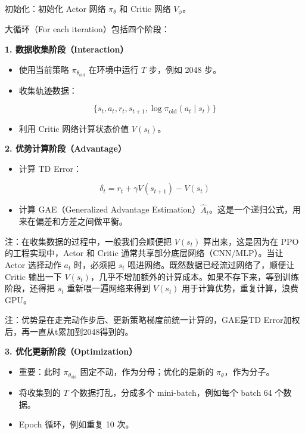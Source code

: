 初始化：初始化 Actor 网络 \(\pi_\theta\) 和 Critic 网络 \(V_\phi\)。

大循环（For each iteration）包括四个阶段：

\textbf{1. 数据收集阶段（Interaction）}

\begin{itemize}
\tightlist
\item
  使用当前策略 \(\pi_{\theta_{\mathrm{old}}}\) 在环境中运行 \(T\) 步，例如 2048 步。
\item
  收集轨迹数据：
\end{itemize}

\[
\{s_t,a_t,r_t,s_{t+1},\log\pi_{\mathrm{old}}(a_t\mid s_t)\}
\]

\begin{itemize}
\tightlist
\item
  利用 Critic 网络计算状态价值 \(V(s_t)\)。
\end{itemize}

\textbf{2. 优势计算阶段（Advantage）}

\begin{itemize}
\tightlist
\item
  计算 TD Error：
\end{itemize}

\[
\delta_t=r_t+\gamma V(s_{t+1})-V(s_t)
\]

\begin{itemize}
\tightlist
\item
  计算 GAE（Generalized Advantage Estimation）\(\hat{A}_t\)。这是一个递归公式，用来在偏差和方差之间做平衡。
\end{itemize}

注：在收集数据的过程中，一般我们会顺便把 \(V(s_t)\) 算出来，这是因为在 PPO 的工程实现中，Actor 和 Critic 通常共享部分底层网络（CNN/MLP）。当让 Actor 选择动作 \(a_t\) 时，必须把 \(s_t\) 喂进网络。既然数据已经流过网络了，顺便让 Critic 输出一下 \(V(s_t)\)，几乎不增加额外的计算成本。如果不存下来，等到训练阶段，还得把 \(s_t\) 重新喂一遍网络来得到 \(V(s_t)\) 用于计算优势，重复计算，浪费 GPU。

注：优势是在走完动作步后、更新策略梯度前统一计算的，GAE是TD Error加权后，再一直从t累加到2048得到的。

\textbf{3. 优化更新阶段（Optimization）}

\begin{itemize}
\tightlist
\item
  重要：此时 \(\pi_{\theta_{\mathrm{old}}}\) 固定不动，作为分母；优化的是新的 \(\pi_\theta\)，作为分子。
\item
  将收集到的 \(T\) 个数据打乱，分成多个 mini-batch，例如每个 batch 64 个数据。
\item
  Epoch 循环，例如重复 10 次。
\end{itemize}

